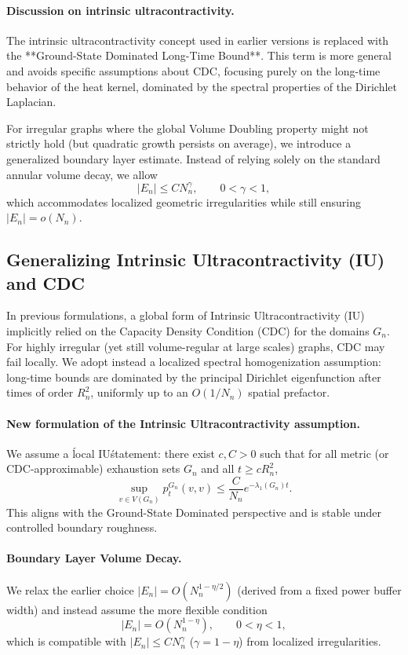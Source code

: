 \documentclass[12pt]{amsart}
\theoremstyle{definition}
\theoremstyle{remark}
\begin{document}
\paragraph{Discussion on intrinsic ultracontractivity.}
The intrinsic ultracontractivity concept used in earlier versions is replaced with the **Ground-State Dominated Long-Time Bound**. This term is more general and avoids specific assumptions about CDC, focusing purely on the long-time behavior of the heat kernel, dominated by the spectral properties of the Dirichlet Laplacian.

For irregular graphs where the global Volume Doubling property might not strictly hold (but quadratic growth persists on average), we introduce a generalized boundary layer estimate. Instead of relying solely on the standard annular volume decay, we allow
\[
	|E_n| \leq C N_n^{\gamma}, \qquad 0 < \gamma < 1,
\]
which accommodates localized geometric irregularities while still ensuring $|E_n| = o(N_n)$.

\subsection{Generalizing Intrinsic Ultracontractivity (IU) and CDC}

In previous formulations, a global form of Intrinsic Ultracontractivity (IU) implicitly relied on the Capacity Density Condition (CDC) for the domains $G_n$. For highly irregular (yet still volume-regular at large scales) graphs, CDC may fail locally. We adopt instead a localized spectral homogenization assumption: long-time bounds are dominated by the principal Dirichlet eigenfunction after times of order $R_n^2$, uniformly up to an $O(1/N_n)$ spatial prefactor.

\paragraph{New formulation of the Intrinsic Ultracontractivity assumption.}
We assume a \'local IU\' statement: there exist $c, C>0$ such that for all metric (or CDC-approximable) exhaustion sets $G_n$ and all $t \ge c R_n^2$,
\[
	\sup_{v \in V(G_n)} p_t^{G_n}(v,v) \le \frac{C}{N_n} e^{-\lambda_1(G_n) t}.
\]
This aligns with the Ground-State Dominated perspective and is stable under controlled boundary roughness.

\paragraph{Boundary Layer Volume Decay.}
We relax the earlier choice $|E_n|=O(N_n^{1-\eta/2})$ (derived from a fixed power buffer width) and instead assume the more flexible condition
\[
	|E_n| = O(N_n^{1-\eta}), \qquad 0<\eta<1,
\]
which is compatible with $|E_n| \le C N_n^{\gamma}$ ($\gamma = 1-\eta$) from localized irregularities.
\end{document}
